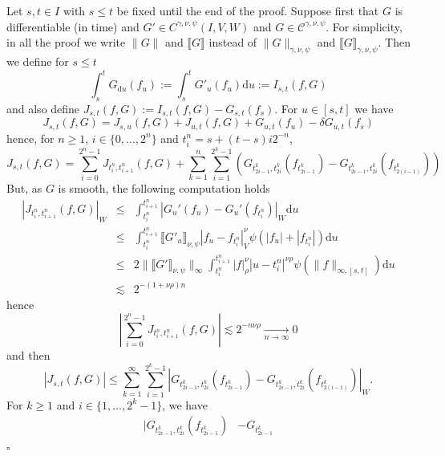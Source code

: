 \documentclass[a4paper,11pt]{article}
\newcommand{\assign}{:=}
\newcommand{\mathd}{\mathrm{d}}
\newenvironment{proof}{{\sc Proof.}}{\hfill$\square$}
\newcommand{\CC}{\mathscr C}
\begin{document}
\begin{proof}
  Let $s,t \in I$ with $s \leqslant t$ be fixed until the end of the proof.
  Suppose first that $G$ is differentiable (in time) and $G' \in C^{\gamma ,
  \nu , \psi} (I,V,W)$ and $G \in \CC^{\gamma , \nu , \psi}$. For simplicity,
  in all the proof we write $\| G \|$ and $\llbracket G \rrbracket$ instead of
  $\| G \|_{\gamma , \nu , \psi}$ and $\llbracket G \rrbracket_{\gamma , \nu ,
  \psi}$. Then we define for $s \leqslant t$
  \[ \int_{s}^{t} G_{\mathd u} (f_{u} ) \assign \int_{s}^{t} G'_{u} (f_{u} )
     \mathd u \assign I_{s,t} (f,G) \]
  and also define $J_{s,t} (f,G) \assign I_{s,t} (f,G) -G_{s,t} (f_{s} )$. For
  $u \in [s,t]$ we have
  \[ J_{s,t} (f,G) =J_{s,u} (f,G) +J_{u,t} (f,G) +G_{u,t} (f_{u} ) - \delta
     G_{u,t} (f_{s} ) \]
  hence, for $n \ge 1$, $i \in \{0, \ldots ,2^{n} \}$ and $t_{i}^{n} =s+ (t-s)
  i2^{-n}$,
  \[ J_{s,t} (f,G) = \sum_{i=0}^{2^{n} -1} J_{t_{i}^{n} ,t_{i+1}^{n}} (f,G) +
     \sum_{k=1}^{n} \sum_{i=1}^{2^{k} -1} (G_{t_{2i-1}^{k} ,t_{2i}^{k}}
     (f_{t_{2i-1}^{k}} )-G_{t_{2i-1}^{k} ,t_{2i}^{k}} (f_{t_{2(i-1)}^{k}} ))
  \]
  But, as $G$ is smooth, the following computation holds
  \begin{eqnarray*}
    | J_{t_{i}^{n} ,t_{i+1}^{n}} (f,G) |_{W} & \leqslant &
    \int_{t_{i}^{n}}^{t_{i+1}^{n}} | G_{u}' (f_{u} )-G_{u}' (f_{t_{i}^{n}} )
    |_{W} \mathd u\\
    & \leqslant & \int_{t_{i}^{n}}^{t_{i+1}^{n}}  \llbracket G'_{u}
    \rrbracket_{\nu , \psi} | f_{u} -f_{t_{i}^{n}} |^{\nu}_{V} \psi ( | f_{u}
    | + | f_{t_{i}^{n}} | ) \mathd u\\
    & \leqslant & 2 \| \llbracket G' \rrbracket_{\nu , \psi} \|_{\infty}
    \int_{t_{i}^{n}}^{t_{i+1}^{n}} | f |^{\nu}_{\rho}  |u-t_{i}^{n} |^{\nu
    \rho} \psi ( \| f \|_{\infty , [ s,t ]} ) \mathd u\\
    & \lesssim & 2^{- (1+ \nu \rho ) n}
  \end{eqnarray*}
  hence
  \[ \left\lvert \sum_{i=0}^{2^{n} -1} J_{t_{i}^{n} ,t_{i+1}^{n}} (f,G) \right\lvert
     \lesssim 2^{-n \nu \rho} \underset{n \to \infty}{\to} 0 \]
  and then
  \[ | J_{s,t} (f,G) | \leqslant \sum_{k=1}^{\infty} \sum_{i=1}^{2^{k} -1}
     |G_{t_{2i-1}^{k} ,t_{2i}^{k}} (f_{t_{2i-1}^{k}} )-G_{t_{2i-1}^{k}
     ,t_{2i}^{k}} (f_{t_{2(i-1)}^{k}} )|_{W} . \]
  For $k \ge 1$ and $i \in \{1, \ldots ,2^{k} -1\}$, we have
  \begin{equation*} \begin{split}
    | G_{t_{2i-1}^{k} ,t_{2i}^{k}} (f_{t_{2i-1}^{k}} )& -G_{t_{2i-1}^{k}
}
\end{split}
\end{equation*}
\end{proof}
\end{document}
